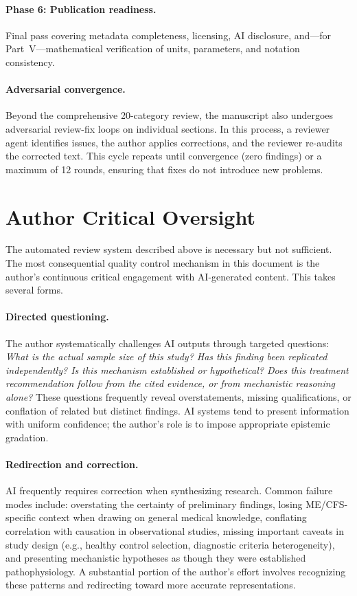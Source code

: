 \paragraph{Phase 6: Publication readiness.}
Final pass covering metadata completeness, licensing, AI disclosure, and---for Part~V---mathematical verification of units, parameters, and notation consistency.

\paragraph{Adversarial convergence.}
Beyond the comprehensive 20-category review, the manuscript also undergoes adversarial review-fix loops on individual sections. In this process, a reviewer agent identifies issues, the author applies corrections, and the reviewer re-audits the corrected text. This cycle repeats until convergence (zero findings) or a maximum of 12 rounds, ensuring that fixes do not introduce new problems.

\section*{Author Critical Oversight}
\label{sec:meth-author-oversight}

The automated review system described above is necessary but not sufficient. The most consequential quality control mechanism in this document is the author's continuous critical engagement with AI-generated content. This takes several forms.

\paragraph{Directed questioning.}
The author systematically challenges AI outputs through targeted questions: \emph{What is the actual sample size of this study? Has this finding been replicated independently? Is this mechanism established or hypothetical? Does this treatment recommendation follow from the cited evidence, or from mechanistic reasoning alone?} These questions frequently reveal overstatements, missing qualifications, or conflation of related but distinct findings. AI systems tend to present information with uniform confidence; the author's role is to impose appropriate epistemic gradation.

\paragraph{Redirection and correction.}
AI frequently requires correction when synthesizing research. Common failure modes include: overstating the certainty of preliminary findings, losing ME/CFS-specific context when drawing on general medical knowledge, conflating correlation with causation in observational studies, missing important caveats in study design (e.g., healthy control selection, diagnostic criteria heterogeneity), and presenting mechanistic hypotheses as though they were established pathophysiology. A substantial portion of the author's effort involves recognizing these patterns and redirecting toward more accurate representations.

